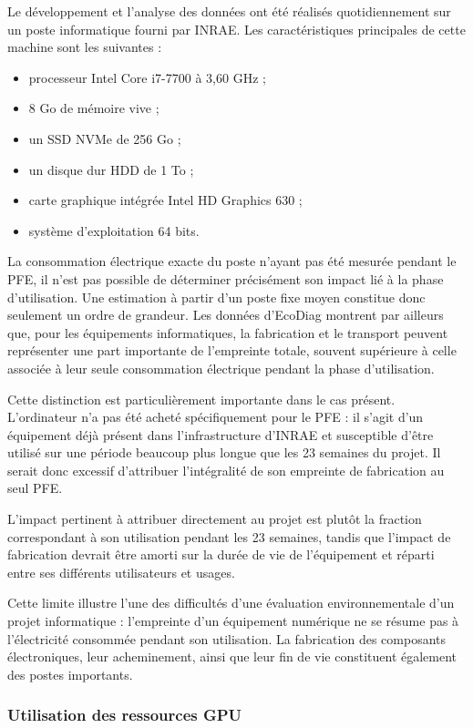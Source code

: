 \documentclass[12pt,a4paper,twoside]{article}
\begin{document}
Le développement et l'analyse des données ont été réalisés quotidiennement sur un poste informatique fourni par INRAE. Les caractéristiques principales de cette machine sont les suivantes :

\begin{itemize}
\item processeur Intel Core i7-7700 à 3,60 GHz ;
\item 8 Go de mémoire vive ;
\item un SSD NVMe de 256 Go ;
\item un disque dur HDD de 1 To ;
\item carte graphique intégrée Intel HD Graphics 630 ;
\item système d'exploitation 64 bits.
\end{itemize}

La consommation électrique exacte du poste n'ayant pas été mesurée pendant le PFE, il n'est pas possible de déterminer précisément son impact lié à la phase d'utilisation. Une estimation à partir d'un poste fixe moyen constitue donc seulement un ordre de grandeur. Les données d'EcoDiag montrent par ailleurs que, pour les équipements informatiques, la fabrication et le transport peuvent représenter une part importante de l'empreinte totale, souvent supérieure à celle associée à leur seule consommation électrique pendant la phase d'utilisation.

Cette distinction est particulièrement importante dans le cas présent. L'ordinateur n'a pas été acheté spécifiquement pour le PFE : il s'agit d'un équipement déjà présent dans l'infrastructure d'INRAE et susceptible d'être utilisé sur une période beaucoup plus longue que les 23 semaines du projet. Il serait donc excessif d'attribuer l'intégralité de son empreinte de fabrication au seul PFE.

L'impact pertinent à attribuer directement au projet est plutôt la fraction correspondant à son utilisation pendant les 23 semaines, tandis que l'impact de fabrication devrait être amorti sur la durée de vie de l'équipement et réparti entre ses différents utilisateurs et usages.

Cette limite illustre l'une des difficultés d'une évaluation environnementale d'un projet informatique : l'empreinte d'un équipement numérique ne se résume pas à l'électricité consommée pendant son utilisation. La fabrication des composants électroniques, leur acheminement, ainsi que leur fin de vie constituent également des postes importants.

\subsubsection{Utilisation des ressources GPU}
\label{subsubsec:rse_gpu}
\end{document}
